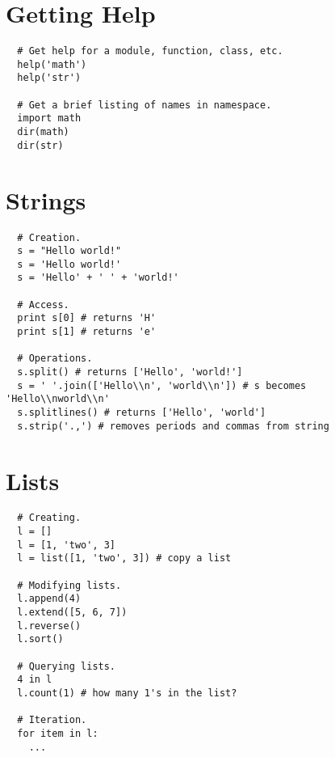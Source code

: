 \documentclass[10pt]{article}
\begin{document}
\maketitle

\section{Getting Help}
\begin{lstlisting}
  # Get help for a module, function, class, etc.
  help('math')
  help('str')

  # Get a brief listing of names in namespace.
  import math
  dir(math)
  dir(str)
\end{lstlisting}

\section{Strings}
\begin{lstlisting}
  # Creation.
  s = "Hello world!"
  s = 'Hello world!'
  s = 'Hello' + ' ' + 'world!'

  # Access.
  print s[0] # returns 'H'
  print s[1] # returns 'e'

  # Operations.
  s.split() # returns ['Hello', 'world!']
  s = ' '.join(['Hello\\n', 'world\\n']) # s becomes 'Hello\\nworld\\n'
  s.splitlines() # returns ['Hello', 'world']
  s.strip('.,') # removes periods and commas from string
\end{lstlisting}

\section{Lists}
\begin{lstlisting}
  # Creating.
  l = []
  l = [1, 'two', 3]
  l = list([1, 'two', 3]) # copy a list

  # Modifying lists.
  l.append(4)
  l.extend([5, 6, 7])
  l.reverse()
  l.sort()

  # Querying lists.
  4 in l
  l.count(1) # how many 1's in the list?

  # Iteration.
  for item in l:
    ...
\end{lstlisting}
\end{document}

